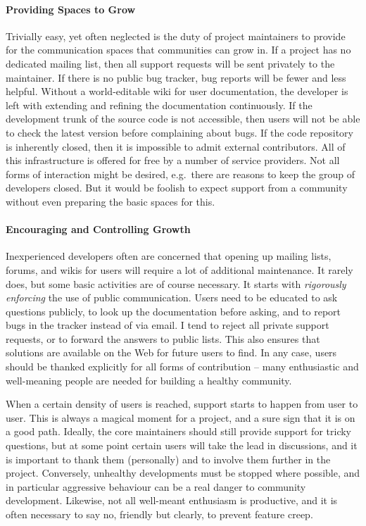 \paragraph*{Providing Spaces to Grow}
Trivially easy, yet often neglected is the duty of project maintainers to provide for the communication spaces that communities can grow in. If a project has no dedicated mailing list, then all support requests will be sent privately to the maintainer. If there is no public bug tracker, bug reports will be fewer and less helpful. Without a world-editable wiki for user documentation, the developer is left with extending and refining the documentation continuously. If the development trunk of the source code is not accessible, then users will not be able to check the latest version before complaining about bugs. If the code repository is inherently closed, then it is impossible to admit external contributors. All of this infrastructure is offered for free by a number of service providers. Not all forms of interaction might be desired, e.g.\ there are reasons to keep the group of developers closed. But it would be foolish to expect support from a community without even preparing the basic spaces for this.

\paragraph*{Encouraging and Controlling Growth}
Inexperienced developers often are concerned that opening up mailing lists, forums, and wikis for users will require a lot of additional maintenance. It rarely does, but some basic activities are of course necessary. It starts with \emph{rigorously enforcing} the use of public communication. Users need to be educated to ask questions publicly, to look up the documentation before asking, and to report bugs in the tracker instead of via email. I tend to reject all private support requests, or to forward the answers to public lists. This also ensures that solutions are available on the Web for future users to find. In any case, users should be thanked explicitly for all forms of contribution -- many enthusiastic and well-meaning people are needed for building a healthy community.

When a certain density of users is reached, support starts to happen from user to user. This is always a magical moment for a project, and a sure sign that it is on a good path. Ideally, the core maintainers should still provide support for tricky questions, but at some point certain users will take the lead in discussions, and it is important to thank them (personally) and to involve them further in the project. Conversely, unhealthy developments must be stopped where possible, and in particular aggressive behaviour can be a real danger to community development. Likewise, not all well-meant enthusiasm is productive, and it is often necessary to say no, friendly but clearly, to prevent feature creep.

